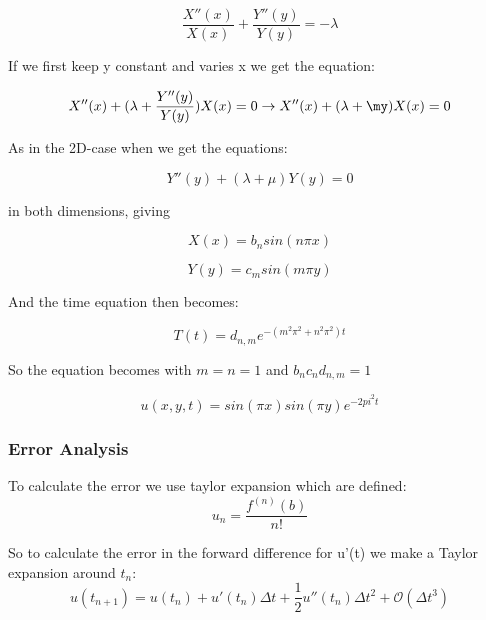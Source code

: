 \documentclass[a4paper,10pt]{article}
\begin{document}
\begin{equation}
 \frac{X''(x)}{X(x)} + \frac{Y''(y)}{Y(y)} = -\lambda
\end{equation}

If we first keep y constant and varies x we get the equation:

\begin{equation}
 X''(x) + (\lambda + \frac{Y''(y)}{Y(y)})X(x) = 0 \rightarrow X''(x) + (\lambda + \my)X(x) = 0
\end{equation}

As in the 2D-case when we get the equations:

\begin{equation}
 Y''(y) + (\lambda + \mu)Y(y) = 0
\end{equation}

in both dimensions, giving

\begin{equation}
 X(x) = b_nsin(n\pi x)
\end{equation}

\begin{equation}
 Y(y) = c_msin(m\pi y)
\end{equation}

And the time equation then becomes:

\begin{equation}
 T(t) = d_{n,m}e^{-(m^2\pi^2 + n^2\pi^2)t}
\end{equation}

So the equation becomes with $m=n=1$ and $b_nc_nd_{n,m} = 1$

\begin{equation}
 u(x,y,t) = sin(\pi x)sin(\pi y) e^{-2pi^2t}
\end{equation}

\subsubsection{Error Analysis}
To calculate the error we use taylor expansion which are defined:
\begin{equation}
 u_n = \frac{f^{(n)}(b)}{n!}
\end{equation}

So to calculate the error in the forward difference for u'(t) we make a Taylor expansion around $t_n$:
\begin{equation}
 u(t_{n+1}) = u(t_n) + u'(t_n)\Delta t + \frac{1}{2}u''(t_n)\Delta t^2 + \mathcal{O}(\Delta t^3)
\end{equation}
\end{document}
